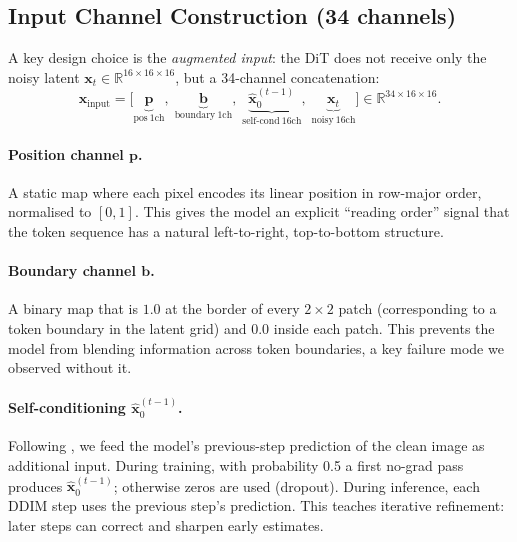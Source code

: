 \documentclass[11pt,a4paper]{article}
\begin{document}
\subsection{Input Channel Construction (34 channels)}
\label{sec:channels}

A key design choice is the \emph{augmented input}: the DiT does not receive only the
noisy latent $\mathbf{x}_t \in \mathbb{R}^{16\times16\times16}$, but a 34-channel
concatenation:
\begin{equation}
  \mathbf{x}_{\text{input}} = \bigl[
    \underbrace{\mathbf{p}}_{\text{pos}\ 1\text{ch}},\;
    \underbrace{\mathbf{b}}_{\text{boundary}\ 1\text{ch}},\;
    \underbrace{\hat{\mathbf{x}}_0^{(t-1)}}_{\text{self-cond}\ 16\text{ch}},\;
    \underbrace{\mathbf{x}_t}_{\text{noisy}\ 16\text{ch}}
  \bigr] \in \mathbb{R}^{34\times16\times16}.
  \label{eq:channels}
\end{equation}

\paragraph{Position channel $\mathbf{p}$.}
A static map where each pixel encodes its linear position in row-major order,
normalised to $[0,1]$. This gives the model an explicit ``reading order'' signal that
the token sequence has a natural left-to-right, top-to-bottom structure.

\paragraph{Boundary channel $\mathbf{b}$.}
\label{sec:boundary}
A binary map that is $1.0$ at the border of every $2\times2$ patch (corresponding to
a token boundary in the latent grid) and $0.0$ inside each patch.
This prevents the model from blending information across token boundaries, a key
failure mode we observed without it.

\paragraph{Self-conditioning $\hat{\mathbf{x}}_0^{(t-1)}$.}
\label{sec:selfcond}
Following \citet{chen2022analog}, we feed the model's previous-step prediction of the
clean image as additional input. During training, with probability 0.5 a first no-grad
pass produces $\hat{\mathbf{x}}_0^{(t-1)}$; otherwise zeros are used (dropout).
During inference, each DDIM step uses the previous step's prediction.
This teaches iterative refinement: later steps can correct and sharpen early estimates.
\end{document}

